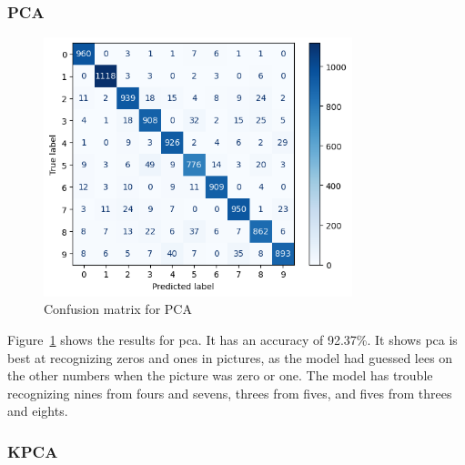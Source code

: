 \subsubsection{PCA}
\begin{figure}[htb!]
    \centering
    \includegraphics[width=0.8\textwidth]{figures/experiment-3/confusion_matrix_pca_svm.png}
    \caption{Confusion matrix for PCA}
    \label{fig:confusion-matrix-pca-svm}
\end{figure}


Figure~\ref{fig:confusion-matrix-pca-svm} shows the results for \gls{pca}. It has an accuracy of 92.37\%. It shows \gls{pca} is best at recognizing zeros and ones in pictures, as the model had guessed lees on the other numbers when the picture was zero or one. The model has trouble recognizing nines from fours and sevens, threes from fives, and fives from threes and eights.

\subsubsection{KPCA}

